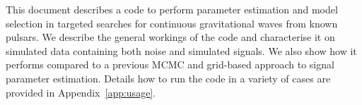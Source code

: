 This document describes a code to perform parameter estimation and model selection in targeted
searches for continuous gravitational waves from known pulsars. We describe the general
workings of the code and characterise it on simulated data containing both noise and
simulated signals. We also show how it performs compared to a previous MCMC and grid-based
approach to signal parameter estimation. Details how to run the code in a variety of
cases are provided in Appendix~\ref{app:usage}. 